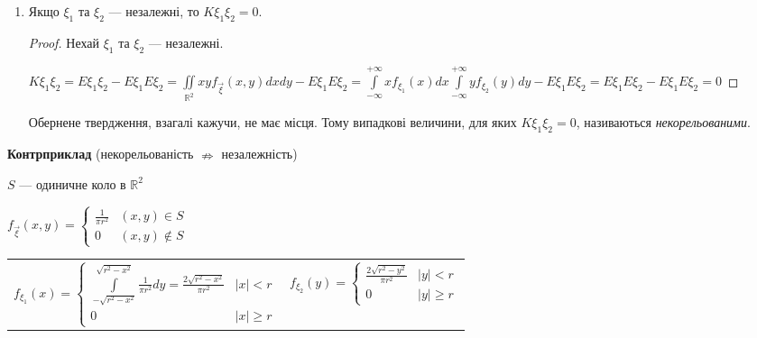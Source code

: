 \begin{enumerate}
\begin{proof}
\begin{enumerate}
            $\left|K\xi_1\xi_2\right| \leq \sigma_{\xi_1} \sigma_{\xi_2}$

            \item $\xi_H = \frac{\xi - E\xi}
            {\sigma_\xi}$, $E\xi_H =0$, $D\xi_H = 1$

            $E(\xi_{H1} \pm \xi_{H2})^2 \geq 0 \Leftrightarrow 
            E(\xi^2_{H1}\pm2\xi_{H1}\xi_{H2}+\xi^2_{H2}) \geq 0 
            \Leftrightarrow 2 \pm 
            2\frac{K\xi_1\xi_2}{\sigma_{\xi_1}\sigma_{\xi_2}} \geq 0 
            \Leftrightarrow $

            $\left|K\xi_1\xi_2\right| \leq \sigma_{\xi_1} \sigma_{\xi_2}$
        \end{enumerate}
    \end{proof}

    \item Якщо $\xi_1$ та $\xi_2$ --- незалежні, то $K\xi_1\xi_2 = 0$.
    \begin{proof}
        Нехай $\xi_1$ та $\xi_2$ --- незалежні.

        $K\xi_1\xi_2 = E\xi_1\xi_2 - E\xi_1E\xi_2 = 
        \iint\limits_{\mathbb{R}^2} xy f_{\vec{\xi}}(x,y)dx dy 
        - E\xi_1E\xi_2
        = \int\limits_{-\infty}^{+\infty}xf_{\xi_1}(x)dx
        \int\limits_{-\infty}^{+\infty}yf_{\xi_2}(y)dy
        - E\xi_1E\xi_2 = 
        E\xi_1E\xi_2 - E\xi_1E\xi_2 = 0$
    \end{proof}

    Обернене твердження, взагалі кажучи, не має місця. Тому випадкові 
    величини, для яких $K\xi_1\xi_2 = 0$, називаються 
    \emph{некорельованими}.
\end{enumerate}

\noindent \textbf{Контрприклад} (некорельованість $\nRightarrow$ незалежність)

$S$ --- одиничне коло в $\mathbb{R}^2$

$f_{\vec{\xi}}(x, y) = 
\begin{cases}
    \frac{1}{\pi r^2} & (x, y) \in S \\
    0 & (x, y) \notin S
\end{cases}
$

\begin{tabular}{c c}
    $f_{\xi_1}(x) = 
        \begin{cases}
            \int\limits_{-\sqrt{r^2 - x^2}}^{\sqrt{r^2 - x^2}} \frac{1}{\pi r^2} dy
            = \frac{2\sqrt{r^2-x^2}}{\pi r^2}& |x| < r \\
            0 & |x| \geq r
        \end{cases}
    $
    &
    $f_{\xi_2}(y) = 
    \begin{cases}
        \frac{2\sqrt{r^2-y^2}}{\pi r^2}& |y| < r \\
        0 & |y| \geq r
    \end{cases}
    $
\end{tabular}

